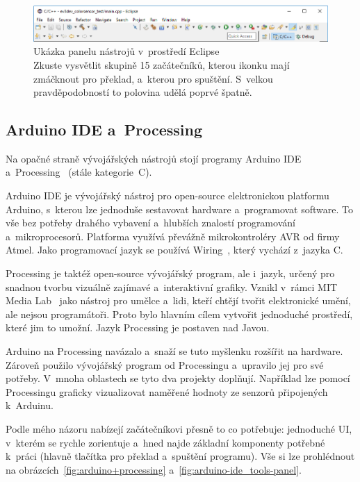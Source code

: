 \begin{figure}[h]
    \centering
    \includegraphics[width=\textwidth]{images/eclipse_tools-panel_focus.png}
    \caption[Ukázka panelu nástrojů v~prostředí Eclipse]{Ukázka panelu nástrojů v~prostředí Eclipse \\
    Zkuste vysvětlit skupině 15 začátečníků, kterou ikonku mají zmáčknout pro překlad, a~kterou pro spuštění. S~velkou pravděpodobností to polovina udělá poprvé špatně.  
    }
    \label{fig:eclipse_tools-panel}
\end{figure}

\subsection{Arduino IDE a~Processing}



Na opačné straně vývojářských nástrojů stojí programy Arduino IDE~\cite{arduino-web} a~Processing~\cite{processing-web} (stále kategorie~C).

Arduino IDE je vývojářský nástroj pro open-source elektronickou platformu Arduino, s~kterou lze jednoduše sestavovat hardware a~programovat software.
To vše bez potřeby drahého vybavení a~hlubších znalostí programování a~mikroprocesorů. 
Platforma využívá převážně mikrokontroléry AVR od firmy Atmel.
Jako programovací jazyk se používá Wiring~\cite{arduino-wiring}, který vychází z~jazyka C.

Processing je taktéž open-source vývojářský program, ale i~jazyk, určený pro snadnou tvorbu vizuálně zajímavé a~interaktivní grafiky.
Vznikl v~rámci MIT Media Lab~\cite{processing-web_overview} jako nástroj pro umělce a~lidi, kteří chtějí tvořit elektronické umění, ale nejsou programátoři.
Proto bylo hlavním cílem vytvořit jednoduché prostředí, které jim to umožní. Jazyk Processing je postaven nad Javou.

Arduino na Processing navázalo a~snaží se tuto myšlenku rozšířit na hardware. 
Zároveň použilo vývojářský program od Processingu a~upravilo jej pro své potřeby. 
V~mnoha oblastech se tyto dva projekty doplňují. 
Například lze pomocí Processingu graficky vizualizovat naměřené hodnoty ze senzorů připojených k~Arduinu.

Podle mého názoru nabízejí začátečníkovi přesně to co potřebuje: jednoduché UI, v~kterém se rychle zorientuje a~hned najde základní komponenty potřebné k~práci (hlavně tlačítka pro překlad a~spuštění programu). 
Vše si lze prohlédnout na obrázcích~\ref{fig:arduino+processing} a~\ref{fig:arduino-ide_tools-panel}.

